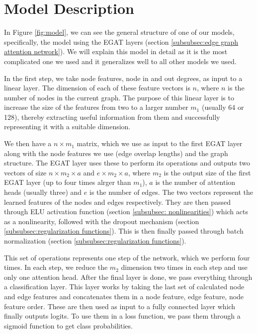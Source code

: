 \documentclass[times, utf8, diplomski, english]{fer_eng}
\begin{document}
\section{Model Description}
\label{sec:model description}

In Figure \ref{fig:model}, we can see the general structure of one of our models, specifically, the model using the EGAT layers (section \ref{subsubsec:edge graph attention network}). We will explain this model in detail as it is the most complicated one we used and it generalizes well to all other models we used.

In the first step, we take node features, node in and out degrees, as input to a linear layer. The dimension of each of these feature vectors is $n$, where $n$ is the number of nodes in the current graph. The purpose of this linear layer is to increase the size of the features from two to a larger number $m_1$ (usually 64 or 128), thereby extracting useful information from them and successfully representing it with a suitable dimension.

We then have a $n \times m_1$ matrix, which we use as input to the first EGAT layer along with the node features we use (edge overlap lengths) and the graph structure. The EGAT layer uses these to perform its operations and outputs two vectors of size $n \times m_2 \times a$ and $e \times m_2 \times a$, where $m_2$ is the output size of the first EGAT layer (up to four times alrger than $m_1$), $a$ is the number of attention heads (usually three) and $e$ is the number of edges. The two vectors represent the learned features of the nodes and edges respectively. They are then passed through ELU activation function (section \ref{subsubsec: nonlinearities}) which acts as a nonlinearity, followed with the dropout mechanism (section \ref{subsubsec:regularization functions}). This is then finally passed through batch normalization (section \ref{subsubsec:regularization functions}).

This set of operations represents one step of the network, which we perform four times. In each step, we reduce the $m_2$ dimension two times in each step and use only one attention head. After the final layer is done, we pass everything through a classification layer. This layer works by taking the last set of calculated node and edge features and concatenates them in a node feature, edge feature, node feature order. These are then used as input to a fully connected layer which finally outputs logits. To use them in a loss function, we pass them through a sigmoid function to get class probabilities.
\end{document}
